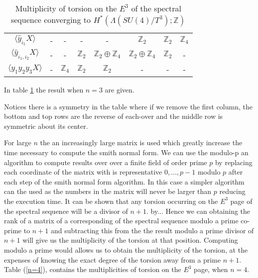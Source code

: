 \documentclass{article}
\theoremstyle{plain}
\theoremstyle{definition}
\numberwithin{thm}{section}
\begin{document}
			\begin{table}[ht]
			\centering
			\caption{Multiplicity of torsion on the $E^3$ of the spectral sequence converging to $H^*(\Lambda(SU(4)/T^3);\mathbb{Z})$}
			\label{n=3}
			\begin{tabular}{c|ccccccc}
			$\langle \hat{y}_{i_1}X \rangle$			& - &  			-				&  				-			 &  							-									& $\mathbb{Z}_2$ 									 & $\mathbb{Z}_2$ & $\mathbb{Z}_4$ \\
			$\langle \hat{y}_{i_1,i_2}X \rangle$	& - &  			-				& $\mathbb{Z}_2$ & $\mathbb{Z}_2\oplus\mathbb{Z}_4$ & $\mathbb{Z}_2\oplus\mathbb{Z}_4$ & $\mathbb{Z}_2$ &  			-				 \\
			$\langle y_1y_2y_3X \rangle$					& - & $\mathbb{Z}_4$& $\mathbb{Z}_2$ & $\mathbb{Z}_2$ 									& 							-									 &  		-					&				-
			\end{tabular}
			\end{table}
			
			In table \ref{n=3} the result when $n=3$ are given. 
			
			Notices there is a symmetry in the table where if we remove the first column, the bottom and top rows are the reverse of each-over and the middle row
			is symmetric about its center.
			
			For large $n$ the an increasingly large matrix is used which greatly increase the time necessary to compute the smith normal form.
			We can use the modulo-p an algorithm to compute results over over a finite field of order prime $p$
			by replacing each coordinate of the matrix with is representative $0,\dots,p-1$ modulo $p$ after each step of the smith normal form algorithm.
			In this case a simpler algorithm can the used as the numbers in the matrix will never be larger than $p$ reducing the execution time.
			It can be shown that any torsion occurring on the $E^3$ page of the spectral sequence will be a divisor of $n+1$.
			\newline
			by...
			\newline
			Hence we can obtaining the rank of a matrix of a corresponding of the spectral sequence modulo a prime co-prime to $n+1$
			and subtracting this from the the result modulo 
			a prime divisor of $n+1$ will give us the multiplicity of the torsion at that position.
			Computing modulo a prime would allows us to obtain the multiplicity of the torsion,
			at the expenses of knowing the exact degree of the torsion away from a prime $n+1$.   
			Table (\ref{n=4}), contains the multiplicities of torsion on the $E^3$ page, when $n=4$.
			
\end{document}
